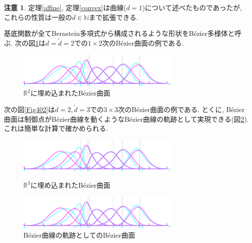 \documentclass{jsarticle}
\newcommand\setN{\mathbb{N}}
\newcommand\setR{\mathbb{R}}
\theoremstyle{definition}%
\newtheorem*{rem}{注意}
\begin{document}
\begin{rem}
    定理\ref{affine}, 定理\ref{convex}は曲線($d=1$)について述べたものであったが, これらの性質は一般の$d\in \setN$まで拡張できる.
\end{rem}

\newpage

基底関数が全てBernstein多項式から構成されるような形状をB\'{e}zier多様体と呼ぶ.
次の図\ref{Fig401}は$d=\tilde{d}=2$での$1\times 2$次のB\'{e}zier曲面の例である.
\addtocounter{footnote}{-1}
\begin{figure}[H]
	\centering
    \includegraphics[page=10,clip,width=80mm]{figA.pdf}
    \caption{$\setR^2$に埋め込まれたB\'{e}zier曲面\protect\footnotemark}
	\label{Fig401}
\end{figure}
次の図\ref{Fig402}は$d=2, \tilde{d}=3$での$3\times 3$次のB\'{e}zier曲面の例である.
とくに, B\'{e}zier曲面は制御点がB\'{e}zier曲線を動くようなB\'{e}zier曲線の軌跡として実現できる(図\ref{Fig403}).
これは簡単な計算で確かめられる.
\begin{figure}[H]
    \begin{minipage}{0.5\hsize}
        \begin{center}
            \includegraphics[page=12,clip,width=80mm]{figA.pdf}
        \end{center}
        \caption{$\setR^3$に埋め込まれたB\'{e}zier曲面}
        \label{Fig402}
    \end{minipage}
    \begin{minipage}{0.5\hsize}
        \begin{center}
            \includegraphics[page=13,clip,width=80mm]{figA.pdf}
        \end{center}
        \caption{B\'{e}zier曲線の軌跡としてのB\'{e}zier曲面}
        \label{Fig403}
    \end{minipage}
\end{figure}
\end{document}
